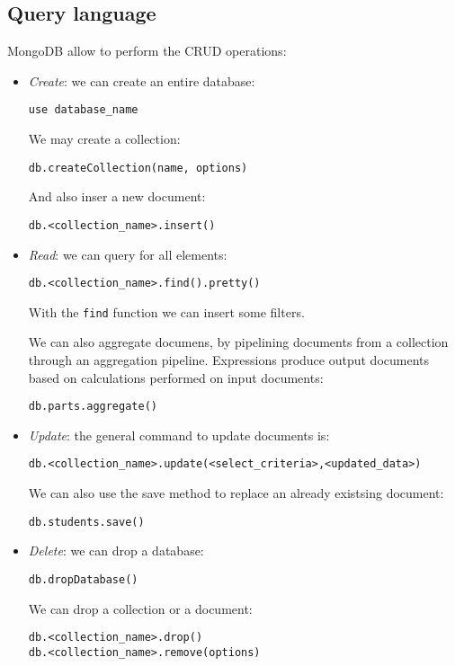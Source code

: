 \subsection{Query language}
MongoDB allow to perform the CRUD operations: 
\begin{itemize}
    \item \textit{Create}: we can create an entire database: 
        \begin{verbatim}
use database_name
        \end{verbatim}
        We may create a collection: 
        \begin{verbatim}
db.createCollection(name, options)
        \end{verbatim}
        And also inser a new document: 
        \begin{verbatim}
db.<collection_name>.insert()
        \end{verbatim}
    \item \textit{Read}: we can query for all elements: 
        \begin{verbatim}
db.<collection_name>.find().pretty()
        \end{verbatim}
        With the \texttt{find} function we can insert some filters. 

        We can also aggregate documens, by pipelining documents from a collection through an aggregation pipeline. 
        Expressions produce output documents based on calculations performed on input documents: 
        \begin{verbatim}
db.parts.aggregate()
        \end{verbatim}
    \item \textit{Update}: the general command to update documents is: 
        \begin{verbatim}
db.<collection_name>.update(<select_criteria>,<updated_data>)
        \end{verbatim}
        We can also use the save method to replace an already existsing document: 
        \begin{verbatim}
db.students.save()
        \end{verbatim}
    \item \textit{Delete}: we can drop a database: 
        \begin{verbatim}
db.dropDatabase()
        \end{verbatim}
        We can drop a collection or a document: 
        \begin{verbatim}
db.<collection_name>.drop()
db.<collection_name>.remove(options)
        \end{verbatim}
\end{itemize}